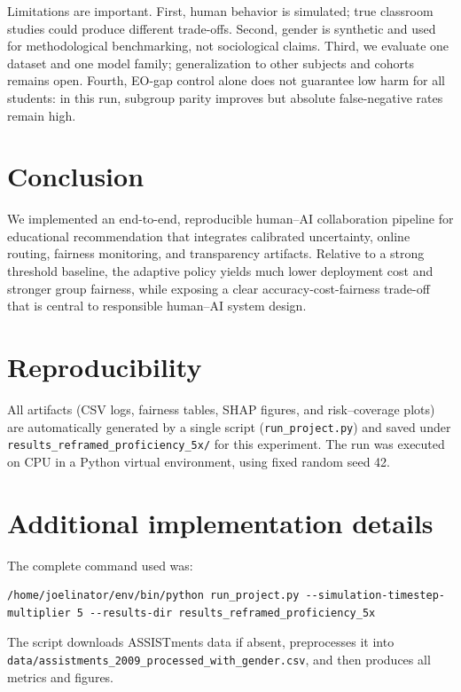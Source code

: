 \documentclass{article}
\begin{document}
Limitations are important. First, human behavior is simulated; true classroom studies could produce different trade-offs. Second, gender is synthetic and used for methodological benchmarking, not sociological claims. Third, we evaluate one dataset and one model family; generalization to other subjects and cohorts remains open. Fourth, EO-gap control alone does not guarantee low harm for all students: in this run, subgroup parity improves but absolute false-negative rates remain high.

\section{Conclusion}
We implemented an end-to-end, reproducible human--AI collaboration pipeline for educational recommendation that integrates calibrated uncertainty, online routing, fairness monitoring, and transparency artifacts. Relative to a strong threshold baseline, the adaptive policy yields much lower deployment cost and stronger group fairness, while exposing a clear accuracy-cost-fairness trade-off that is central to responsible human--AI system design.

\section*{Reproducibility}
All artifacts (CSV logs, fairness tables, SHAP figures, and risk--coverage plots) are automatically generated by a single script (\texttt{run\_project.py}) and saved under \texttt{results\_reframed\_proficiency\_5x/} for this experiment. The run was executed on CPU in a Python virtual environment, using fixed random seed 42.




\appendix
\section{Additional implementation details}
The complete command used was:
\begin{verbatim}
/home/joelinator/env/bin/python run_project.py --simulation-timestep-multiplier 5 --results-dir results_reframed_proficiency_5x
\end{verbatim}
The script downloads ASSISTments data if absent, preprocesses it into
\texttt{data/assistments\_2009\_processed\_with\_gender.csv}, and then produces all metrics and figures.

\newpage

\end{document}
